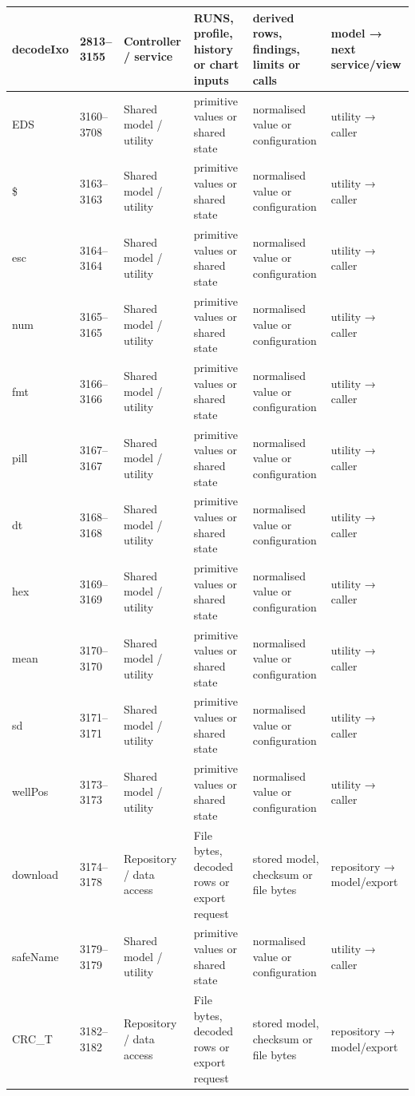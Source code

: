 \begin{landscape}
\begin{longtable}{@{}p{3.2cm}p{1.45cm}p{2.7cm}p{4.0cm}p{4.0cm}p{3.0cm}@{}}
decodeIxo & 2813--3155 & Controller / service & RUNS, profile, history or chart inputs & derived rows, findings, limits or calls & model → next service/view \\\hline
EDS & 3160--3708 & Shared model / utility & primitive values or shared state & normalised value or configuration & utility → caller \\\hline
\$ & 3163--3163 & Shared model / utility & primitive values or shared state & normalised value or configuration & utility → caller \\\hline
esc & 3164--3164 & Shared model / utility & primitive values or shared state & normalised value or configuration & utility → caller \\\hline
num & 3165--3165 & Shared model / utility & primitive values or shared state & normalised value or configuration & utility → caller \\\hline
fmt & 3166--3166 & Shared model / utility & primitive values or shared state & normalised value or configuration & utility → caller \\\hline
pill & 3167--3167 & Shared model / utility & primitive values or shared state & normalised value or configuration & utility → caller \\\hline
dt & 3168--3168 & Shared model / utility & primitive values or shared state & normalised value or configuration & utility → caller \\\hline
hex & 3169--3169 & Shared model / utility & primitive values or shared state & normalised value or configuration & utility → caller \\\hline
mean & 3170--3170 & Shared model / utility & primitive values or shared state & normalised value or configuration & utility → caller \\\hline
sd & 3171--3171 & Shared model / utility & primitive values or shared state & normalised value or configuration & utility → caller \\\hline
wellPos & 3173--3173 & Shared model / utility & primitive values or shared state & normalised value or configuration & utility → caller \\\hline
download & 3174--3178 & Repository / data access & File bytes, decoded rows or export request & stored model, checksum or file bytes & repository → model/export \\\hline
safeName & 3179--3179 & Shared model / utility & primitive values or shared state & normalised value or configuration & utility → caller \\\hline
CRC\_T & 3182--3182 & Repository / data access & File bytes, decoded rows or export request & stored model, checksum or file bytes & repository → model/export \\\hline

\end{longtable}
\end{landscape}
